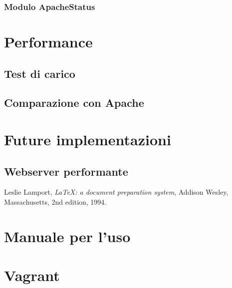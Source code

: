 \documentclass[italian]{tktltiki2}
\begin{document}
\subsubsection{Modulo ApacheStatus}

\newpage
\section{Performance}
\subsection{Test di carico}
\subsection{Comparazione con Apache}

\newpage
\section{Future implementazioni}
\subsection{Webserver performante}


%
%
% 
%


\newpage
%
%
\renewcommand{\refname}{\normalfont\selectfont\normalsize\textbf{Annotazioni}} 
\begin{thebibliography}{9}
  Leslie Lamport,
  \emph{\LaTeX: a document preparation system},
  Addison Wesley, Massachusetts,
  2nd edition,
  1994.
  
\end{thebibliography}

\newpage
\appendix
 
\section{Manuale per l'uso}

\section{Vagrant}
\end{document}
